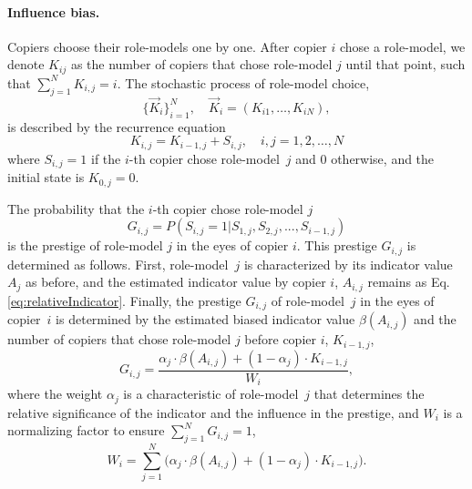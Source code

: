 \documentclass[11pt]{article}
\begin{document}
\paragraph{Influence bias.}
Copiers choose their role-models one by one.
After copier $i$ chose a role-model, we denote $K_{ij}$ as the number of copiers that chose role-model $j$ until that point, such that $\sum_{j=1}^N{K_{i,j}} = i$. 
The stochastic process of role-model choice, 
\begin{equation} \label{eq:process}
\big\{\vec{K}_i\big\}_{i=1}^N, \quad \vec{K}_i=(K_{i1}, \ldots, K_{iN}),
\end{equation}
is described by the recurrence equation
\begin{equation} \label{eq:recurrence}
K_{i,j} = K_{i-1,j} + S_{i,j}, \quad i,j=1,2,\ldots,N
\end{equation}
where $S_{i,j}=1$ if the $i$-th copier chose role-model~$j$ and 0 otherwise, and the initial state is $K_{0,j}=0$.

The probability that the $i$-th copier chose role-model $j$
\begin{equation}\label{eq:recPrestige}
G_{i,j}=P(S_{i,j}=1| S_{1,j},S_{2,j},...,S_{i-1,j})
\end{equation}
is the prestige of role-model $j$ in the eyes of copier $i$.
This prestige $G_{i,j}$ is determined as follows.
First, role-model~$j$ is characterized by its indicator value $A_j$ as before, and the estimated indicator value by copier $i$, $A_{i,j}$ remains as Eq. \ref{eq:relativeIndicator}.
Finally, the prestige $G_{i,j}$ of role-model~$j$ in the eyes of copier~$i$ is determined by the estimated biased indicator value $\beta(A_{i,j})$ and the number of copiers that chose role-model $j$ before copier $i$, $K_{i-1,j}$, 
\begin{equation}\label{prestige_eq}
G_{i,j} = \frac{\alpha_j \cdot \beta(A_{i,j}) + (1-\alpha_j) \cdot K_{i-1,j}}{W_i},
\end{equation}
where the weight $\alpha_j$ is a characteristic of role-model~$j$ that determines the relative significance of the indicator and the influence in the prestige, and $W_i$ is a normalizing factor to ensure $\sum_{j=1}^N{G_{i,j}}=1$,
\begin{equation}
W_i = \sum_{j=1}^N{\Big(\alpha_j \cdot \beta(A_{i,j}) + (1-\alpha_j) \cdot K_{i-1,j}\Big)}.
\end{equation}
\end{document}
